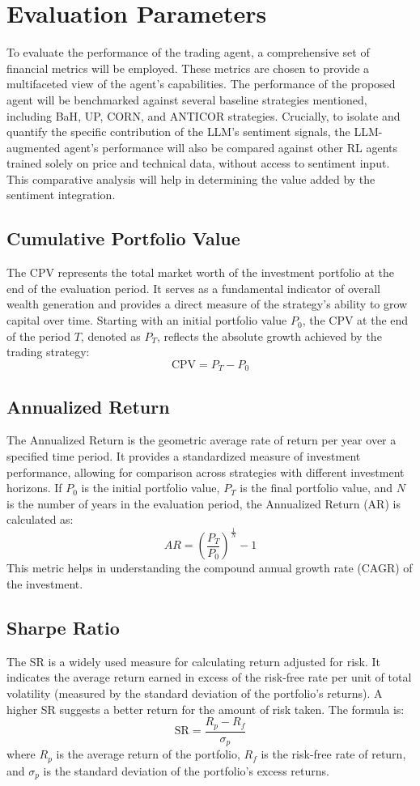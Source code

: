 \section{Evaluation Parameters}
To evaluate the performance of the trading agent, a comprehensive set of financial metrics will be employed. These metrics are chosen to provide a multifaceted view of the agent's capabilities. The performance of the proposed agent will be benchmarked against several baseline strategies mentioned, including \gls{BaH}, \gls{UP}, \gls{CORN}, and \gls{ANTICOR} strategies. Crucially, to isolate and quantify the specific contribution of the \gls{LLM}'s sentiment signals, the LLM-augmented agent's performance will also be compared against other \gls{RL} agents trained solely on price and technical data, without access to sentiment input. This comparative analysis will help in determining the value added by the sentiment integration.

\subsection{Cumulative Portfolio Value}
The \gls{CPV} represents the total market worth of the investment portfolio at the end of the evaluation period. It serves as a fundamental indicator of overall wealth generation and provides a direct measure of the strategy's ability to grow capital over time. Starting with an initial portfolio value \(P_0\), the CPV at the end of the period \(T\), denoted as \(P_T\), reflects the absolute growth achieved by the trading strategy:
\[\text{CPV} = P_T - P_0\]

\subsection{Annualized Return}
The Annualized Return is the geometric average rate of return per year over a specified time period. It provides a standardized measure of investment performance, allowing for comparison across strategies with different investment horizons. If \(P_0\) is the initial portfolio value, \(P_T\) is the final portfolio value, and \(N\) is the number of years in the evaluation period, the Annualized Return (AR) is calculated as:
\[ AR = \left( \frac{P_T}{P_0} \right)^{\frac{1}{N}} - 1 \]
This metric helps in understanding the compound annual growth rate (CAGR) of the investment.

\subsection{Sharpe Ratio}
The \gls{SR} is a widely used measure for calculating return adjusted for risk. It indicates the average return earned in excess of the risk-free rate per unit of total volatility (measured by the standard deviation of the portfolio's returns). A higher \gls{SR} suggests a better return for the amount of risk taken. The formula is:
\[\text{SR} = \frac{R_p - R_f}{\sigma_p}\]
where \(R_p\) is the average return of the portfolio, \(R_f\) is the risk-free rate of return, and \(\sigma_p\) is the standard deviation of the portfolio's excess returns.

